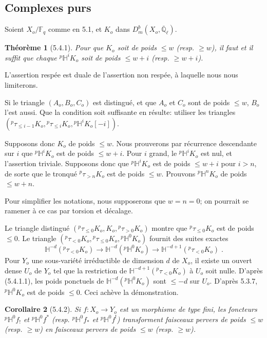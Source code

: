 \documentclass[12pt,a4paper]{article}
\theoremstyle{plain}
\newtheorem{theorem}{Th\'eor\`eme}[section]
\newtheorem{corollary}[theorem]{Corollaire}
\theoremstyle{definition}
\theoremstyle{remark}
\newcommand{\FF}{\mathbb{F}}
\newcommand{\HH}{\mathbb{H}}
\newcommand{\QQ}{\mathbb{Q}}
\begin{document}
\subsection{Complexes purs}

Soient $X_o/\FF_q$ comme en 5.1, et $K_o$ dans $D^b_m(X_o, \overline{\QQ}_{\ell})$.

\begin{theorem}[5.4.1]
Pour que $K_o$ soit de poids $\leq w$ (resp. $\geq w$), il faut et il suffit que chaque ${}^{p}\HH^iK_o$ soit de poids $\leq w+i$ (resp. $\geq w+i$).
\end{theorem}

L'assertion resp\'ee est duale de l'assertion non resp\'ee, \`a laquelle nous nous limiterons.

Si le triangle $(A_o, B_o, C_o)$ est distingu\'e, et que $A_o$ et $C_o$ sont de poids $\leq w$, $B_o$ l'est aussi. Que la condition soit suffisante en r\'esulte: utiliser les triangles $({}^{p}\tau_{\leq i-1}K_o, {}^{p}\tau_{\leq i}K_o, {}^{p}\HH^iK_o[-i])$.

Supposons donc $K_o$ de poids $\leq w$. Nous prouverons par r\'ecurrence descendante sur $i$ que ${}^{p}\HH^iK_o$ est de poids $\leq w+i$. Pour $i$ grand, le ${}^{p}\HH^iK_o$ est nul, et l'assertion triviale. Supposons donc que ${}^{p}\HH^iK_o$ est de poids $\leq w+i$ pour $i > n$, de sorte que le tronqu\'e ${}^{p}\tau_{>n}K_o$ est de poids $\leq w$. Prouvons ${}^{p}\HH^nK_o$ de poids $\leq w+n$.

Pour simplifier les notations, nous supposerons que $w = n = 0$; on pourrait se ramener \`a ce cas par torsion et d\'ecalage.

Le triangle distingu\'e $({}^{p}\tau_{\leq 0}K_o, K_o, {}^{p}\tau_{>0}K_o)$ montre que ${}^{p}\tau_{\leq 0}K_o$ est de poids $\leq 0$. Le triangle $({}^{p}\tau_{<0}K_o, {}^{p}\tau_{\leq 0}K_o, {}^{p}\HH^0K_o)$ fournit des suites exactes
\begin{equation}\label{eq:5.4.1.1}
\HH^{-d}({}^{p}\tau_{<0}K_o) \to \HH^{-d}({}^{p}\HH^0K_o) \to \HH^{-d+1}({}^{p}\tau_{<0}K_o)\;.
\end{equation}
Pour $Y_o$ une sous-vari\'et\'e irr\'eductible de dimension $d$ de $X_o$, il existe un ouvert dense $U_o$ de $Y_o$ tel que la restriction de $\HH^{-d+1}({}^{p}\tau_{<0}K_o)$ \`a $U_o$ soit nulle. D'apr\`es (5.4.1.1), les poids ponctuels de $\HH^{-d}({}^{p}\HH^0K_o)$ sont $\leq -d$ sur $U_o$. D'apr\`es 5.3.7, ${}^{p}\HH^0K_o$ est de poids $\leq 0$. Ceci ach\`eve la d\'emonstration.

\begin{corollary}[5.4.2]
Si $f: X_o \to Y_o$ est un morphisme de type fini, les foncteurs ${}^{p}\HH^0f_!$ et ${}^{p}\HH^0f^*$ (resp. ${}^{p}\HH^0f_*$ et ${}^{p}\HH^0f^!$) transforment faisceaux pervers de poids $\leq w$ (resp. $\geq w$) en faisceaux pervers de poids $\leq w$ (resp. $\geq w$).
\end{corollary}
\end{document}
